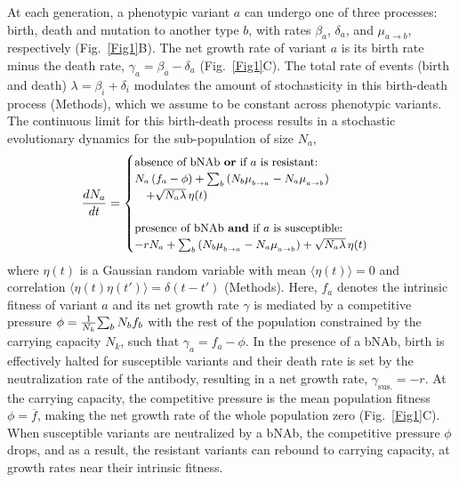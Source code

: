 \documentclass[aps,prx,noshowpacs,twocolumn,nofootinbib]{revtex4-2}
\newcommand{\EQA}{\begin{eqnarray}}
\newcommand{\EEA}{\end{eqnarray}}
\begin{document}
At each generation, a phenotypic variant $a$ can undergo one of three processes: birth, death and mutation to another type $b$, with rates $\beta_a$, $\delta_a$, and $\mu_{a \to b}$, respectively (Fig.~\ref{Fig1}B).  The net growth rate of  variant $a$  is its birth rate minus the death rate, $\gamma_a= \beta_a - \delta_a$ (Fig.~\ref{Fig1}C).  The total rate of events (birth and death) $\lambda = \beta_i + \delta_i$ modulates the amount of stochasticity in this birth-death process (Methods), which we assume to be constant across phenotypic variants.  The continuous limit for this birth-death process results in a stochastic evolutionary dynamics  for the sub-population of size $N_a$,
\EQA
{\small \frac{dN_a}{dt}= \begin{cases}
\text{absence of bNAb {\bf or} if $a$ is resistant:} \\
 N_a \left(f_a - \phi \right) +   \sum_{b}\left( N_b \mu_{{}_{b\to a}} - N_a \mu_{{}_{a\to b}} \right)\\ \quad +   \sqrt{N_{a} \lambda } \, \eta(t)     \\\\
\text{presence of bNAb {\bf and} if $a$ is susceptible:} \\
-r N_a +  \sum_{b}\left( N_b \mu_{{}_{b\to a}}- N_a \mu_{{}_{a\to b}} \right) +   \sqrt{N_{a} \lambda } \, \eta(t)  
\end{cases} }
\label{Langevin}
\EEA 
where  $\eta(t) $ is a Gaussian random variable with mean $\langle \eta(t)\rangle =0$ and correlation $\langle \eta(t) \eta(t')\rangle =\delta(t-t')$ (Methods). Here, $f_a$ denotes  the intrinsic  fitness of variant $a$ and its net growth rate $\gamma$ is mediated by a competitive pressure ${\small \phi =  \frac{1}{N_k} {\sum_{b} N_b f_b}}$ with the rest of the  population constrained by the carrying capacity $N_k$, such that $\gamma_a = f_a-\phi$.  In the presence of a bNAb, birth is effectively halted for susceptible variants and their death rate is set by the neutralization rate of the antibody, resulting in a net growth rate, $\gamma_\text{sus.} = - r$. At the carrying capacity, the competitive pressure is the mean population fitness  $\phi=\overline{f}$, making the net growth rate of the whole population zero (Fig.~\ref{Fig1}C). When susceptible variants are neutralized by a bNAb, the competitive pressure $\phi$ drops, and as a result, the resistant variants can rebound to carrying capacity, at growth rates near their intrinsic fitness.
\end{document}
